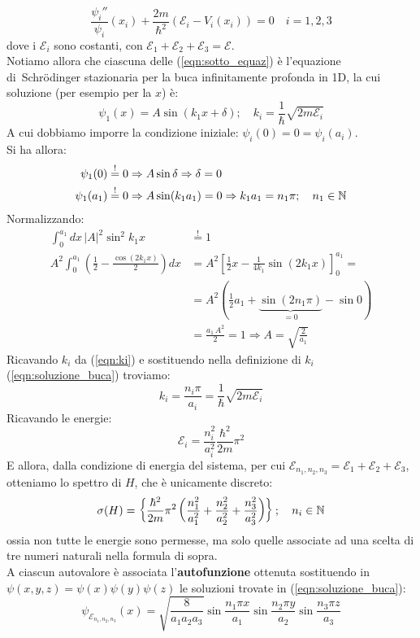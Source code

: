 \documentclass[../../FisicaTeorica.tex]{subfiles}
\begin{document}
\begin{equation}
\frac{\psi_i''}{\psi_i}(x_i)+\frac{2m}{\hbar^2}(\mathcal{E}_i-V_i(x_i))=0\quad i=1,2,3
\label{eqn:sotto_equaz}
\end{equation}
dove i $\mathcal{E}_i$ sono costanti, con $\mathcal{E}_1+\mathcal{E}_2 +\mathcal{E}_3 = \mathcal{E}$.\\
Notiamo allora che ciascuna delle (\ref{eqn:sotto_equaz}) è l'equazione di\ Schrödinger stazionaria per la buca infinitamente profonda in 1D, la cui soluzione (per esempio per la $x$) è:
\begin{equation}
\psi_1(x)=A\sin(k_1 x+\delta);\quad k_i = \frac{1}{\hbar}\sqrt{2m\mathcal{E}_i}
\label{eqn:soluzione_buca}
\end{equation}
A cui dobbiamo imporre la condizione iniziale: $\psi_i(0)=0=\psi_i(a_i)$.\\
Si ha allora:
\begin{align}
    \nonumber \psi_1(0) &\overset{!}{=} 0 \Rightarrow A\sin\delta\Rightarrow \delta=0\\
    \psi_1(a_1) &\overset{!}{=} 0 \Rightarrow A\sin(k_1 a_1) = 0 \Rightarrow k_1 a_1 = n_1 \pi; \quad n_1 \in \mathbb{N}
    \label{eqn:ki}
\end{align}
Normalizzando:
\begin{align*}
\int_0^{a_1} dx\,|A|^2 \sin^2 k_1 x &\overset{!}{=} 1\\
A^2 \int_0^{a_1} \left(\frac{1}{2}-\frac{\cos(2k_1 x)}{2}\right)dx &= A^2 \left[
\frac{1}{2}x-\frac{1}{4k_1}\sin(2k_1 x)
\right ]_0^{a_1} = \\
&= A^2\left(\frac{1}{2}a_1 + \underbrace{\sin(2n_1\pi)}_{=0} -\sin 0\right )\\ & =  \frac{a_1\, A^2}{2} = 1 \Rightarrow A=\sqrt{\frac{2}{a_1}}
\end{align*}
Ricavando $k_i$ da (\ref{eqn:ki}) e sostituendo nella definizione di $k_i$ (\ref{eqn:soluzione_buca}) troviamo:
\[
k_i = \frac{n_i \pi}{a_i} = \frac{1}{\hbar}\sqrt{2m\mathcal{E}_i}
\]
Ricavando le energie:
\[
\mathcal{E}_i = \frac{n_i^2}{a_i^2}\frac{\hbar^2}{2m}\pi^2
\]
E allora, dalla condizione di energia del sistema, per cui $\mathcal{E}_{n_1,n_2,n_3}=\mathcal{E}_1+\mathcal{E}_2+\mathcal{E}_3$, otteniamo lo spettro di $H$, che è unicamente discreto:
\[
\sigma(H)=\left \{
\frac{\hbar^2}{2m}\pi^2 \left(\frac{n_1^2}{a_1^2}+\frac{n_2^2}{a_2^2}+\frac{n_3^2}{a_3^2}\right)
\right \}; \quad n_i \in \mathbb{N}
\]
ossia non tutte le energie sono permesse, ma solo quelle associate ad una scelta di tre numeri naturali nella formula di sopra.\\
A ciascun autovalore è associata l'\textbf{autofunzione} ottenuta sostituendo in $\psi(x,y,z)=\psi(x)\psi(y)\psi(z)$ le soluzioni trovate in (\ref{eqn:soluzione_buca}):
\[
\psi_{\mathcal{E}_{n_1,n_2,n_3}}(x)=\sqrt{\frac{8}{a_1 a_2 a_3}}\sin \frac{n_1 \pi x}{a_1}\sin \frac{n_2 \pi y}{a_2}\sin \frac{n_3 \pi z }{a_3}
\]
\end{document}
